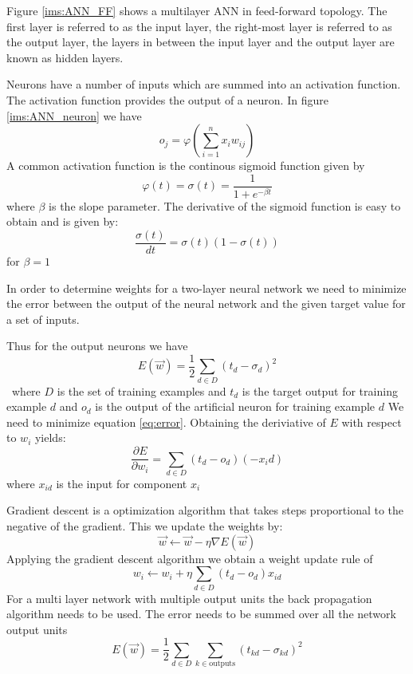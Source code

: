 Figure \ref{ims:ANN_FF} shows a multilayer ANN in feed-forward topology. The first layer is referred to as the input layer, the right-most layer is referred to as the output layer, the layers in between the input layer and the output layer are known as hidden layers.

Neurons have a number of inputs which are summed into an activation function. The activation function provides the output of a neuron.
In figure \ref{ims:ANN_neuron} we have
\[ o_j = \varphi\left(\sum^{n}_{i=1} x_i w_{ij}\right)  \]
A common activation function is the continous sigmoid function given by
\begin{equation} \varphi(t) = \sigma(t) = \frac{1}{1+e^{-\beta t}}  \label{eq:sigmoid}\end{equation}
where $\beta$ is the slope parameter.
The derivative of the sigmoid function is easy to obtain and is given by:
\begin{equation} \frac{\sigma(t)}{dt} = \sigma(t)(1-\sigma(t))\label{eq:sigmoidd}\end{equation}
for $\beta=1$

In order to determine weights for a two-layer neural network we need to minimize the error between the output of the neural network and the given target value for a set of inputs. 

Thus for the output neurons we have
\begin{equation} E(\vec{w}) = \frac{1}{2} \sum_{d \in D}(t_d - \sigma_d)^2 \label{eq:error} \end{equation}\
where $D$ is the set of training examples and $t_d$ is the target output for training example $d$ and $o_d$ is the output of the artificial neuron for training example $d$
We need to minimize equation \ref{eq:error}.
Obtaining the deriviative of $E$ with respect to $w_i$ yields:
\[ \frac{\partial E}{\partial w_i} = \sum_{d\in D}(t_d - o_d)(-x_id) \]
where $x_{id}$ is the input for component $x_i$

Gradient descent is a optimization algorithm that takes steps proportional to the negative of the gradient. This we update the weights by:
\[\vec{w} \leftarrow \vec{w} - \eta \nabla E(\vec{w}) \]
Applying the gradient descent algorithm we obtain a weight update rule of
\[ w_i \leftarrow w_i + \eta \sum_{d \in D} (t_d - o_d) x_{id} \]
For a multi layer network with multiple output units the back propagation algorithm needs to be used.
The error needs to be summed over all the network output units
\[E(\vec{w}) = \frac{1}{2} \sum_{d \in D} \sum_{k \in \text{outputs}} (t_{kd} - \sigma_{kd})^2 \]


